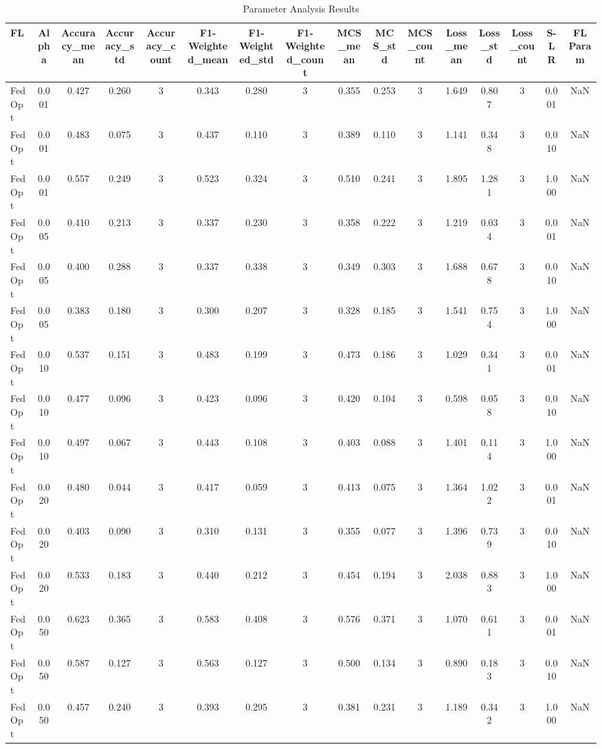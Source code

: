 \begin{table}[htbp]
\caption{Parameter Analysis Results}
\label{tab:params}
\begin{tabular}{lccccccccccccccc}
\toprule
FL & Alpha & Accuracy_mean & Accuracy_std & Accuracy_count & F1-Weighted_mean & F1-Weighted_std & F1-Weighted_count & MCS_mean & MCS_std & MCS_count & Loss_mean & Loss_std & Loss_count & S-LR & FL Param \\
\midrule
FedOpt & 0.001 & 0.427 & 0.260 & 3 & 0.343 & 0.280 & 3 & 0.355 & 0.253 & 3 & 1.649 & 0.807 & 3 & 0.001 & NaN \\
FedOpt & 0.001 & 0.483 & 0.075 & 3 & 0.437 & 0.110 & 3 & 0.389 & 0.110 & 3 & 1.141 & 0.348 & 3 & 0.010 & NaN \\
FedOpt & 0.001 & 0.557 & 0.249 & 3 & 0.523 & 0.324 & 3 & 0.510 & 0.241 & 3 & 1.895 & 1.281 & 3 & 1.000 & NaN \\
FedOpt & 0.005 & 0.410 & 0.213 & 3 & 0.337 & 0.230 & 3 & 0.358 & 0.222 & 3 & 1.219 & 0.034 & 3 & 0.001 & NaN \\
FedOpt & 0.005 & 0.400 & 0.288 & 3 & 0.337 & 0.338 & 3 & 0.349 & 0.303 & 3 & 1.688 & 0.678 & 3 & 0.010 & NaN \\
FedOpt & 0.005 & 0.383 & 0.180 & 3 & 0.300 & 0.207 & 3 & 0.328 & 0.185 & 3 & 1.541 & 0.754 & 3 & 1.000 & NaN \\
FedOpt & 0.010 & 0.537 & 0.151 & 3 & 0.483 & 0.199 & 3 & 0.473 & 0.186 & 3 & 1.029 & 0.341 & 3 & 0.001 & NaN \\
FedOpt & 0.010 & 0.477 & 0.096 & 3 & 0.423 & 0.096 & 3 & 0.420 & 0.104 & 3 & 0.598 & 0.058 & 3 & 0.010 & NaN \\
FedOpt & 0.010 & 0.497 & 0.067 & 3 & 0.443 & 0.108 & 3 & 0.403 & 0.088 & 3 & 1.401 & 0.114 & 3 & 1.000 & NaN \\
FedOpt & 0.020 & 0.480 & 0.044 & 3 & 0.417 & 0.059 & 3 & 0.413 & 0.075 & 3 & 1.364 & 1.022 & 3 & 0.001 & NaN \\
FedOpt & 0.020 & 0.403 & 0.090 & 3 & 0.310 & 0.131 & 3 & 0.355 & 0.077 & 3 & 1.396 & 0.739 & 3 & 0.010 & NaN \\
FedOpt & 0.020 & 0.533 & 0.183 & 3 & 0.440 & 0.212 & 3 & 0.454 & 0.194 & 3 & 2.038 & 0.883 & 3 & 1.000 & NaN \\
FedOpt & 0.050 & 0.623 & 0.365 & 3 & 0.583 & 0.408 & 3 & 0.576 & 0.371 & 3 & 1.070 & 0.611 & 3 & 0.001 & NaN \\
FedOpt & 0.050 & 0.587 & 0.127 & 3 & 0.563 & 0.127 & 3 & 0.500 & 0.134 & 3 & 0.890 & 0.183 & 3 & 0.010 & NaN \\
FedOpt & 0.050 & 0.457 & 0.240 & 3 & 0.393 & 0.295 & 3 & 0.381 & 0.231 & 3 & 1.189 & 0.342 & 3 & 1.000 & NaN \\

\end{tabular}
\end{table}

